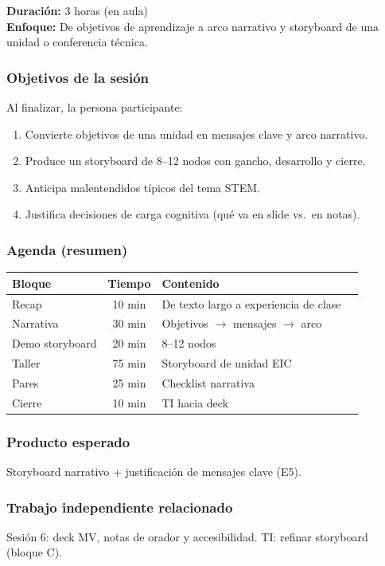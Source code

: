 \textbf{Duración:} 3 horas (en aula)\\
\textbf{Enfoque:} De objetivos de aprendizaje a arco narrativo y storyboard de una unidad o conferencia técnica.

\subsubsection*{Objetivos de la sesión}
Al finalizar, la persona participante:
\begin{enumerate}
\item Convierte objetivos de una unidad en mensajes clave y arco narrativo.
\item Produce un storyboard de 8--12 nodos con gancho, desarrollo y cierre.
\item Anticipa malentendidos típicos del tema STEM.
\item Justifica decisiones de carga cognitiva (qué va en slide vs.\ en notas).
\end{enumerate}

\subsubsection*{Agenda (resumen)}
\begin{tabularx}{\textwidth}{@{}lclX@{}}
\toprule
Bloque & Tiempo & Contenido \\
\midrule
Recap & 10 min & De texto largo a experiencia de clase \\
Narrativa & 30 min & Objetivos $\rightarrow$ mensajes $\rightarrow$ arco \\
Demo storyboard & 20 min & 8--12 nodos \\
Taller & 75 min & Storyboard de unidad EIC \\
Pares & 25 min & Checklist narrativa \\
Cierre & 10 min & TI hacia deck \\
\bottomrule
\end{tabularx}

\subsubsection*{Producto esperado}
Storyboard narrativo + justificación de mensajes clave (E5).

\subsubsection*{Trabajo independiente relacionado}
Sesión 6: deck MV, notas de orador y accesibilidad. TI: refinar storyboard (bloque C).
